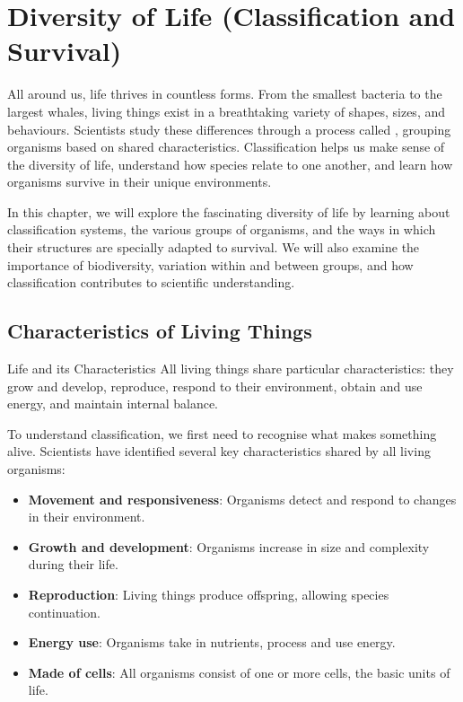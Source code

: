 \chapter{Diversity of Life (Classification and Survival)}

All around us, life thrives in countless forms. From the smallest bacteria to the largest whales, living things exist in a breathtaking variety of shapes, sizes, and behaviours. Scientists study these differences through a process called , grouping organisms based on shared characteristics. Classification helps us make sense of the diversity of life, understand how species relate to one another, and learn how organisms survive in their unique environments.

In this chapter, we will explore the fascinating diversity of life by learning about classification systems, the various groups of organisms, and the ways in which their structures are specially adapted to survival. We will also examine the importance of biodiversity, variation within and between groups, and how classification contributes to scientific understanding.

\section{Characteristics of Living Things}

\begin{keyconcept}{Life and its Characteristics}
All living things share particular characteristics: they grow and develop, reproduce, respond to their environment, obtain and use energy, and maintain internal balance.
\end{keyconcept}

To understand classification, we first need to recognise what makes something alive. Scientists have identified several key characteristics shared by all living organisms:

\begin{itemize}
    \item \textbf{Movement and responsiveness}: Organisms detect and respond to changes in their environment.
    \item \textbf{Growth and development}: Organisms increase in size and complexity during their life.
    \item \textbf{Reproduction}: Living things produce offspring, allowing species continuation.
    \item \textbf{Energy use}: Organisms take in nutrients, process and use energy.
    \item \textbf{Made of cells}: All organisms consist of one or more cells, the basic units of life.
\end{itemize}

